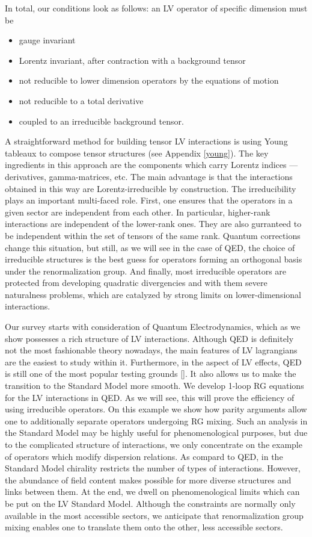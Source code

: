 \documentclass[12pt]{revtex4}
\begin{document}
	In total, our conditions look as follows: 
	an LV operator of specific dimension must be
\begin{itemize}
	\item gauge invariant
	\item Lorentz invariant, after contraction with a background tensor
	\item not reducible to lower dimension operators by the equations
		of motion
	\item not reducible to a total derivative
	\item coupled to an irreducible background tensor.
\end{itemize}

	A straightforward method for building tensor LV interactions is using Young
	tableaux to compose tensor structures (see Appendix \ref{young}).
	The key ingredients in this approach are the components which carry 
	Lorentz indices --- derivatives, gamma-matrices, etc.
	The main advantage is that the interactions obtained in this way are
	Lorentz-irreducible by construction.
	The irreducibility plays an important multi-faced role. 
	First, one ensures that the operators in a given sector are independent
	from each other.
	In particular, higher-rank interactions are independent of the lower-rank
	ones.
	They are also gurranteed to be independent within the set of tensors of the
	same rank.
	Quantum corrections change this situation, but still, as we will see 
	in the case of QED, the choice of irreducible structures is the best guess 
	for operators forming an orthogonal basis under the renormalization group.
	And finally, most irreducible operators are protected from developing
	quadratic divergencies and with them severe naturalness problems,
	which are catalyzed by strong limits on lower-dimensional interactions.

	Our survey starts with consideration of Quantum Electrodynamics, 
	which as we show possesses a rich structure of LV interactions.
	Although QED is definitely not the most fashionable theory nowadays,
	the main features of LV lagrangians are the easiest to study within it.
	Furthermore, in the aspect of LV effects, QED is still one of the
	most popular testing grounds [].
	It also allows us to make the transition to the Standard Model more
	smooth. 
	We develop 1-loop RG equations for the LV interactions in QED.
	As we will see, this will prove the efficiency of using irreducible
	operators.
	On this example we show how parity arguments allow one to additionally 
	separate operators undergoing RG mixing.
	Such an analysis in the Standard Model may be highly useful for 
	phenomenological purposes, but due to the complicated structure of
	interactions, we only concentrate on the example of operators which
	modify dispersion relations.
	As compard to QED, in the Standard Model chirality restricts the number of types
	of interactions. 
	However, the abundance of field content makes possible for more diverse 
	structures and links between them.
	At the end, we dwell on phenomenological limits which can be put
	on the LV Standard Model. 
	Although the constraints are normally only available in the most
	accessible sectors, we anticipate that renormalization group mixing
	enables one to translate them onto the other, less accessible sectors.
	
\end{document}
